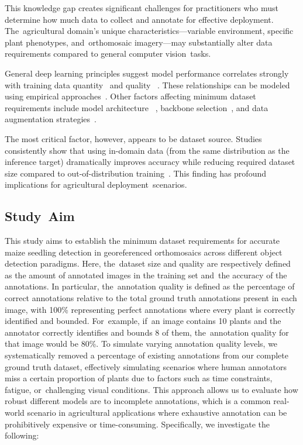 \documentclass[12pt,a4paper,oneside]{report}
\begin{document}
This knowledge gap creates significant challenges for practitioners who must determine
how much data to collect and annotate for effective deployment. The~agricultural
domain's unique characteristics—variable environment, specific plant phenotypes, and~orthomosaic imagery—may substantially alter data requirements compared to general
computer vision~tasks.

General deep learning principles suggest model performance correlates strongly with
training data quantity~\cite{sunRevisitingUnreasonableEffectiveness2017} and quality
~\cite{alhazmiEffectsAnnotationQuality2021}. These relationships can be modeled using
empirical approaches~\cite{hestnessDeepLearningScaling2017,mahmoodHowMuchMore2022}.
Other factors affecting minimum dataset requirements include model architecture
~\cite{nguyenEvaluationDeepLearning2020}, backbone selection~\cite{duSpineNetLearningScalePermuted2020},
and data augmentation strategies~\cite{shortenSurveyImageData2019}.

The most critical factor, however, appears to be dataset source. Studies consistently
show that using in-domain data (from the same distribution as the inference target)
dramatically improves accuracy while reducing required dataset size compared to
out-of-distribution training~\cite{davidPlantDetectionCounting2021,
andvaagCountingCanolaGeneralizable2024}. This finding has profound implications for
agricultural deployment~scenarios.

\subsection{Study~Aim}

This study aims to establish the minimum dataset requirements for accurate maize
seedling detection in georeferenced orthomosaics across different object detection
paradigms. Here, the~dataset size and quality are respectively defined as the amount of
annotated images in the training set and~the accuracy of the annotations.
In particular, the~annotation quality is defined as the percentage of correct
annotations relative to the total ground truth annotations present in each image, 
with 100\% representing perfect annotations where every plant is correctly identified 
and bounded. For~example, if~an image contains 10 plants and the annotator correctly 
identifies and bounds 8 of them, the~annotation quality for that image would be 80\%. 
To simulate varying annotation quality levels, we systematically removed a percentage 
of existing annotations from our complete ground truth dataset, effectively simulating 
scenarios where human annotators miss a certain proportion of plants due to factors 
such as time constraints, fatigue, or~challenging visual conditions. This approach 
allows us to evaluate how robust different models are to incomplete annotations, 
which is a common real-world scenario in agricultural applications where exhaustive 
annotation can be prohibitively expensive or time-consuming.
Specifically, we investigate the following:
\end{document}
